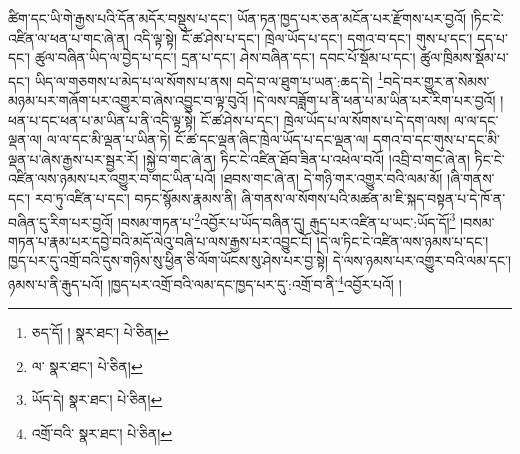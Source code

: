 ཚིག་དང་ཡི་གེ་རྒྱས་པའི་དོན་མདོར་བསྡུས་པ་དང་། ཡོན་ཏན་ཁྱད་པར་ཅན་མངོན་པར་རྫོགས་པར་བྱའོ། །ཏིང་ངེ་འཛིན་ལ་ཕན་པ་གང་ཞེ་ན། འདི་ལྟ་སྟེ། ངོ་ཚ་ཤེས་པ་དང་། ཁྲེལ་ཡོད་པ་དང་། དགའ་བ་དང་། གུས་པ་དང་། དད་པ་དང་། ཚུལ་བཞིན་ཡིད་ལ་བྱེད་པ་དང་། དྲན་པ་དང་། ཤེས་བཞིན་དང་། དབང་པོ་སྡོམ་པ་དང་། ཚུལ་ཁྲིམས་སྡོམ་པ་དང་། ཡིད་ལ་གཅགས་པ་མེད་པ་ལ་སོགས་པ་ནས། བདེ་བ་ལ་ཐུག་པ་ཡན་:ཆད་དེ། \footnote{ཅད་དོ། །   སྣར་ཐང་།  པེ་ཅིན། }བདེ་བར་གྱུར་ན་སེམས་མཉམ་པར་གཞོག་པར་འགྱུར་བ་ཞེས་འབྱུང་བ་ལྟ་བུའོ། །དེ་ལས་བཟློག་པ་ནི་ཕན་པ་མ་ཡིན་པར་རིག་པར་བྱའོ། །ཕན་པ་དང་ཕན་པ་མ་ཡིན་པ་ནི་འདི་ལྟ་སྟེ། ངོ་ཚ་ཤེས་པ་དང་། ཁྲེལ་ཡོད་པ་ལ་སོགས་པ་དེ་དག་ལས། ལ་ལ་དང་ལྡན་ལ། ལ་ལ་དང་མི་ལྡན་པ་ཡིན་ཏེ། ངོ་ཚ་དང་ལྡན་ཞིང་ཁྲེལ་ཡོད་པ་དང་ལྡན་ལ། དགའ་བ་དང་གུས་པ་དང་མི་ལྡན་པ་ཞེས་རྒྱས་པར་སྦྱར་རོ། །སྐྱེ་བ་གང་ཞེ་ན། ཏིང་ངེ་འཛིན་ཐོབ་ཟིན་པ་འཕེལ་བའོ། །འབྲི་བ་གང་ཞེ་ན། ཏིང་ངེ་འཛིན་ལས་ཉམས་པར་འགྱུར་བ་གང་ཡིན་པའོ། །ཐབས་གང་ཞེ་ན། དེ་གཉི་གར་འགྱུར་བའི་ལམ་མོ། །ཞི་གནས་དང་། རབ་ཏུ་འཛིན་པ་དང་། བཏང་སྙོམས་རྣམས་ནི། ཞི་གནས་ལ་སོགས་པའི་མཚན་མ་ཇི་སྐད་བསྟན་པ་དེ་ཁོ་ན་བཞིན་དུ་རིག་པར་བྱའོ། །བསམ་གཏན་པ་\footnote{ལ་  སྣར་ཐང་།  པེ་ཅིན། }འབྱོར་པ་ཡོད་བཞིན་དུ། རྒུད་པར་འཛིན་པ་ཡང་:ཡོད་དོ།\footnote{ཡོད་དེ།  སྣར་ཐང་།  པེ་ཅིན། } །བསམ་གཏན་པ་རྣམ་པར་དབྱེ་བའི་མདོ་ལེའུ་བཞི་པ་ལས་རྒྱས་པར་འབྱུང་ངོ། །དེ་ལ་ཏིང་ངེ་འཛིན་ལས་ཉམས་པ་དང་། ཁྱད་པར་དུ་འགྲོ་བའི་དུས་གཉིས་སུ་ཕྱིན་ཅི་ལོག་ཡོངས་སུ་ཤེས་པར་བྱ་སྟེ། དེ་ལས་ཉམས་པར་འགྱུར་བའི་ལམ་དང་། ཉམས་པ་ནི་རྒུད་པའོ། །ཁྱད་པར་འགྲོ་བའི་ལམ་དང་ཁྱད་པར་དུ་:འགྲོ་བ་ནི་\footnote{འགྲོ་བའི་  སྣར་ཐང་།  པེ་ཅིན། }འབྱོར་པའོ། །
